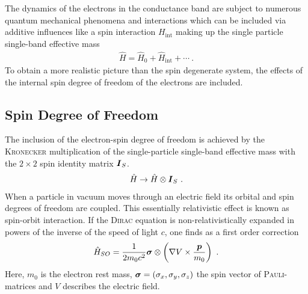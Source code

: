 The dynamics of the electrons in the conductance band are subject to numerous quantum mechanical phenomena and interactions which can be included via additive influences like a spin interaction \hamil{} $H_{\text{int}}$ making up the single particle single-band effective mass \hamil{}
\begin{align}
\hat{H} = \hat{H}_0 + \hat{H}_{\text{int}}+\dotsb \label{eqn:generalhamil}\ .
\end{align}
To obtain a more realistic picture than the spin degenerate system, the effects of the internal spin degree of freedom of the electrons are included.
\subsection{Spin Degree of Freedom}
The inclusion of the electron-spin degree of freedom is achieved by the \textsc{Kronecker} multiplication of the single-particle single-band effective mass \hamil{}  with the $2 \times 2$ spin identity matrix $\boldsymbol{I}_S$. 
\begin{align}
\hat{H} \rightarrow \hat{H} \otimes \boldsymbol{I}_S\ .
\end{align}
When a particle in vacuum moves through an electric field its orbital and spin degrees of freedom are coupled. This essentially relativistic effect is known as spin-orbit interaction. If the \textsc{Dirac} equation is non-relativistically expanded in powers of the inverse of the speed of light $c$, one finds as a first order correction \cite{Nowack2009Thesis}
\begin{align}
\hat{H}_{SO} = \frac{1}{2m_0c^2} \boldsymbol{\sigma} \otimes \left( \nabla V \times \frac{\boldsymbol{p}}{m_0}\right)\ .
\label{eqn:spinorbithamil}
\end{align}
Here, $m_0$ is the electron rest mass, $\boldsymbol{\sigma} = (\sigma_x, \sigma_y,\sigma_z)$ the spin vector of \textsc{Pauli}-matrices and $V$ describes the electric field. 
